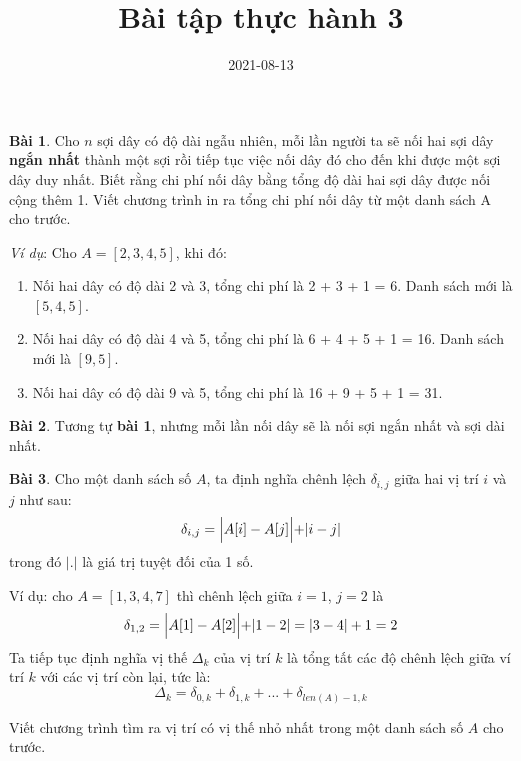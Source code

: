 \documentclass[12pt, a4paper]{article}
\title{Bài tập thực hành 3}
\date{2021-08-13}
\author{}
\begin{document}
    \onehalfspacing
    \maketitle
    \textbf{Bài 1}. Cho $n$ sợi dây có độ dài ngẫu nhiên, mỗi lần người ta sẽ nối hai sợi dây \textbf{ngắn nhất}
    thành một sợi rồi tiếp tục việc nối dây đó cho đến khi được một sợi dây duy nhất. 
    Biết rằng chi phí nối dây bằng tổng độ dài hai sợi dây được nối cộng thêm 1. 
    Viết chương trình in ra tổng chi phí nối dây từ một danh sách A cho trước.
    
    \textit{Ví dụ}: Cho $A = [2, 3, 4, 5]$, khi đó:
    \begin{enumerate}
        \item Nối hai dây có độ dài 2 và 3, tổng chi phí là 2 + 3 + 1 = 6. Danh sách mới là $[5, 4, 5]$.
        \item Nối hai dây có độ dài 4 và 5, tổng chi phí là 6 + 4 + 5 + 1 = 16. Danh sách mới là $[9, 5]$.
        \item Nối hai dây có độ dài 9 và 5, tổng chi phí là 16 + 9 + 5 + 1 = 31.
    \end{enumerate}

    \textbf{Bài 2}. Tương tự \textbf{bài 1}, nhưng mỗi lần nối dây sẽ là nối sợi ngắn nhất và sợi dài nhất.
    
    \textbf{Bài 3}.  Cho một danh sách số $A$, ta định nghĩa chênh lệch $\delta_{i,j}$ giữa hai vị trí $i$ và $j$ như sau:
    $$\delta_{i,j} = \Bigl|A[i]-A[j]\Bigl| + |i-j|$$
    trong đó $|.|$ là giá trị tuyệt đối của 1 số.

    Ví dụ: cho $A = [1, 3, 4, 7]$ thì chênh lệch giữa $i = 1$, $j = 2$ là 
    $$\delta_{1,2} = \Bigl|A[1]-A[2]\Bigl| + |1-2| = |3-4| + 1 = 2$$
    Ta tiếp tục định nghĩa vị thế $\Delta_k$ của vị trí $k$ 
    là tổng tất các độ chênh lệch giữa ví trí $k$ với các vị trí còn lại, tức là:
    $$\Delta_k = \delta_{0,k} + \delta_{1,k} + ... + \delta_{len(A)-1, k}$$

    Viết chương trình tìm ra vị trí có vị thế nhỏ nhất trong một danh sách số $A$ cho trước.
\end{document}
